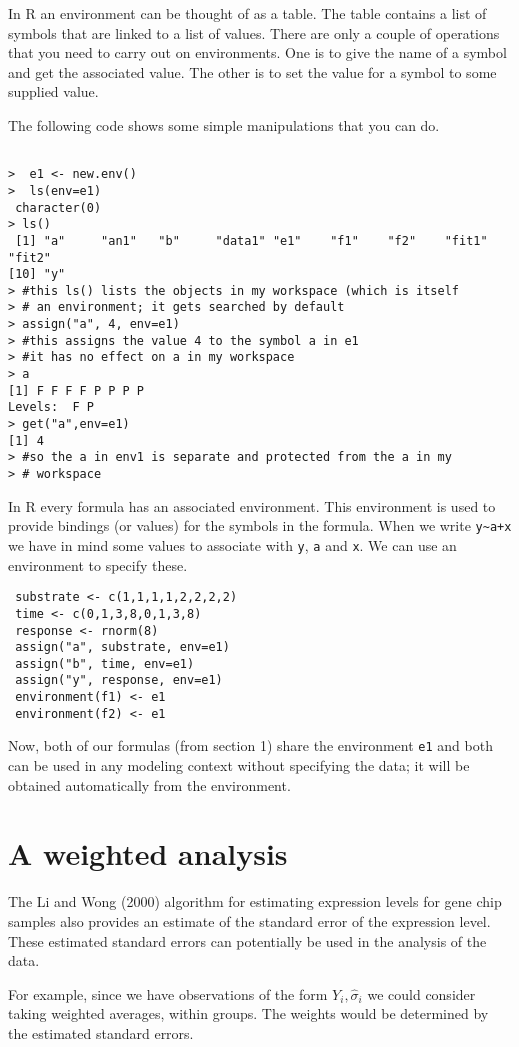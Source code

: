 \documentclass{article}
\begin{document}
In R an environment can be thought of as a table. The table contains a
list of symbols that are linked to a list of values.
There are only a couple of operations that you need to carry out on
environments. One is to give the name of a symbol and get the
associated value. The other is to set the value for a symbol to some
supplied value.

The following code shows some simple manipulations that you can do.

\begin{verbatim}

>  e1 <- new.env()
>  ls(env=e1)
 character(0)
> ls()
 [1] "a"     "an1"   "b"     "data1" "e1"    "f1"    "f2"    "fit1"  "fit2" 
[10] "y" 
> #this ls() lists the objects in my workspace (which is itself
> # an environment; it gets searched by default
> assign("a", 4, env=e1)
> #this assigns the value 4 to the symbol a in e1
> #it has no effect on a in my workspace
> a
[1] F F F F P P P P
Levels:  F P 
> get("a",env=e1)
[1] 4
> #so the a in env1 is separate and protected from the a in my
> # workspace
\end{verbatim}

In R every formula has an associated environment. This environment is
used to provide bindings (or values) for the symbols in the
formula. When we write \verb=y~a+x= we have in mind some values to
associate with \verb+y+, \verb+a+ and \verb+x+. We can use an
environment to specify these.

\begin{verbatim}
 substrate <- c(1,1,1,1,2,2,2,2)
 time <- c(0,1,3,8,0,1,3,8)
 response <- rnorm(8)
 assign("a", substrate, env=e1)
 assign("b", time, env=e1)
 assign("y", response, env=e1)
 environment(f1) <- e1
 environment(f2) <- e1
\end{verbatim}
Now, both of our formulas (from section 1) share the environment
\verb+e1+ and both can be used in any modeling context without
specifying the data; it will be obtained automatically from the
environment. 

\section{A weighted analysis}

The Li and Wong (2000) algorithm for estimating expression levels for
gene chip samples also provides an estimate of the standard error of
the expression level. These estimated standard errors can potentially
be used in the analysis of the data.

For example, since we have observations of the form $Y_i,
\hat{\sigma}_i$ we could consider taking weighted averages, within
groups. The weights would be determined by the estimated standard
errors.
\end{document}
